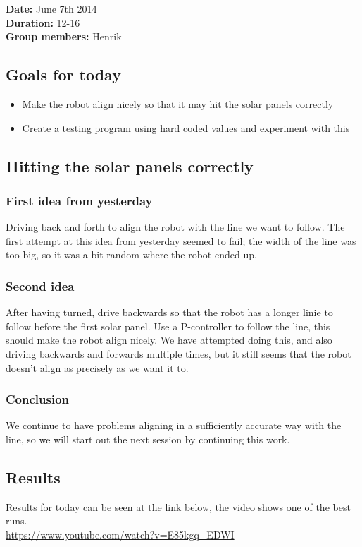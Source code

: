 \textbf{Date:} June 7th 2014\\\textbf{Duration:} 12-16\\\textbf{Group
members:} Henrik

\subsection{Goals for today}

\begin{itemize}
\itemsep1pt\parskip0pt
\item
  Make the robot align nicely so that it may hit the solar panels
  correctly
\item
  Create a testing program using hard coded values and experiment with
  this
\end{itemize}

\subsection{Hitting the solar panels correctly}

\subsubsection{First idea from yesterday}

Driving back and forth to align the robot with the line we want to
follow. The first attempt at this idea from yesterday seemed to fail;
the width of the line was too big, so it was a bit random where the
robot ended up.

\subsubsection{Second idea}

After having turned, drive backwards so that the robot has a longer
linie to follow before the first solar panel. Use a P-controller to
follow the line, this should make the robot align nicely. We have
attempted doing this, and also driving backwards and forwards multiple
times, but it still seems that the robot doesn't align as precisely as
we want it to.

\subsubsection{Conclusion}

We continue to have problems aligning in a sufficiently accurate way
with the line, so we will start out the next session by continuing this
work.

\subsection{Results}

Results for today can be seen at the link below, the video shows one of
the best runs.\\ \url{https://www.youtube.com/watch?v=E85kgq_EDWI}

